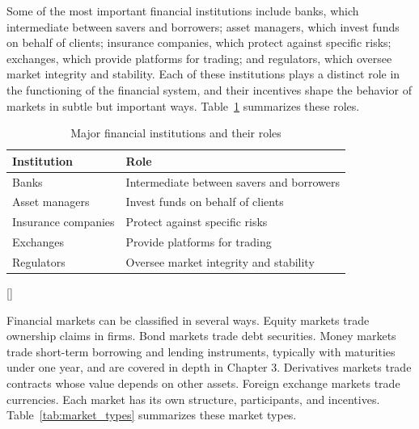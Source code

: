 \documentclass[../ai_in_finance]{subfiles}
\begin{document}
Some of the most important financial institutions include banks, which intermediate between savers and borrowers; asset managers, which invest funds on behalf of clients; insurance companies, which protect against specific risks; exchanges, which provide platforms for trading; and regulators, which oversee market integrity and stability. Each of these institutions plays a distinct role in the functioning of the financial system, and their incentives shape the behavior of markets in subtle but important ways. Table~\ref{tab:market_institutions} summarizes these roles.

\begin{table}[htbp]
\centering
\begin{lrbox}{\bookmeasuredbox}
\begin{tabular}{p{4.0cm}p{8.0cm}}
\toprule
Institution & Role \\
\midrule
Banks & Intermediate between savers and borrowers \\
Asset managers & Invest funds on behalf of clients \\
Insurance companies & Protect against specific risks \\
Exchanges & Provide platforms for trading \\
Regulators & Oversee market integrity and stability \\
\bottomrule
\end{tabular}
\end{lrbox}
\ifdim\wd\bookmeasuredbox<0.65\linewidth
\setlength{\bookcapwidth}{0.65\linewidth}
\else
\setlength{\bookcapwidth}{\wd\bookmeasuredbox}
\fi
{}[\bookcapwidth]{
\usebox{\bookmeasuredbox}
}{
\caption{Major financial institutions and their roles}
\label{tab:market_institutions}
}
\end{table}

Financial markets can be classified in several ways. Equity markets trade ownership claims in firms. Bond markets trade debt securities. Money markets trade short-term borrowing and lending instruments, typically with maturities under one year, and are covered in depth in Chapter 3. Derivatives markets trade contracts whose value depends on other assets. Foreign exchange markets trade currencies. Each market has its own structure, participants, and incentives. Table~\ref{tab:market_types} summarizes these market types.
\end{document}
